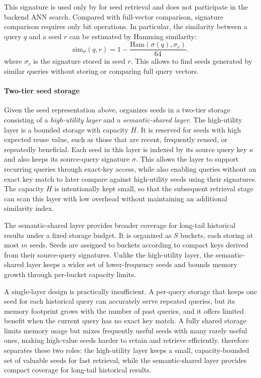 This signature is used only by \system for seed retrieval and does not participate in the backend ANN search.
Compared with full-vector comparison, signature comparison requires only bit operations.
In particular, the similarity between a query $q$ and a seed $r$ can be estimated by Hamming similarity:
\begin{equation}
\mathrm{sim}_{\sigma}(q,r)
=
1-\frac{\mathrm{Ham}(\sigma(q),\sigma_r)}{64}.
\label{eq:Ham}
\end{equation}
where $\sigma_r$ is the signature stored in seed $r$.
This allows \system to find seeds generated by similar queries without storing or comparing full query vectors.


\paragraph{Two-tier seed storage}
Given the seed representation above, \system organizes seeds in a two-tier storage consisting of a \textit{high-utility layer} and a \textit{semantic-shared layer}.
The high-utility layer is a bounded storage with capacity $H$. It is reserved for seeds with high expected reuse value, such as those that are recent, frequently reused, or repeatedly beneficial.
Each seed in this layer is indexed by its source query key $\kappa$ and also keeps its source-query signature $\sigma$.
This allows the layer to support recurring queries through exact-key access, while also enabling queries without an exact key match to later compare against high-utility seeds using their signatures.
The capacity $H$ is intentionally kept small, so that the subsequent retrieval stage can scan this layer with low overhead without maintaining an additional similarity index.


The semantic-shared layer provides broader coverage for long-tail historical results under a fixed storage budget.
It is organized as $S$ buckets, each storing at most $m$ seeds.
Seeds are assigned to buckets according to compact keys derived from their source-query signatures.
Unlike the high-utility layer, the semantic-shared layer keeps a wider set of lower-frequency seeds and bounds memory growth through per-bucket capacity limits.

A single-layer design is practically insufficient.
A per-query storage that keeps one seed for each historical query can accurately serve repeated queries, but its memory footprint grows with the number of past queries, and it offers limited benefit when the current query has no exact key match.
A fully shared storage limits memory usage but mixes frequently useful seeds with many rarely useful ones, making high-value seeds harder to retain and retrieve efficiently.
\system therefore separates these two roles: the high-utility layer keeps a small, capacity-bounded set of valuable seeds for fast retrieval, while the semantic-shared layer provides compact coverage for long-tail historical results.









